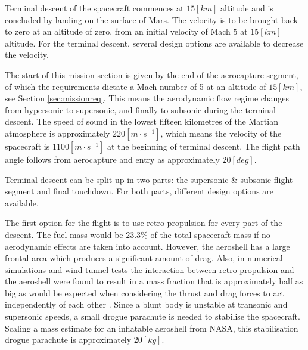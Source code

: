 Terminal descent of the spacecraft commences at $15 [km]$ altitude and is concluded by landing on the surface of Mars. The velocity is to be brought back to zero at an altitude of zero, from an initial velocity of Mach $5$ at $15 [km]$ altitude. For the terminal descent, several design options are available to decrease the velocity.%

The start of this mission section is given by the end of the aerocapture segment, of which the requirements dictate a Mach number of 5 at an altitude of $15 [km]$, see Section \ref{sec:missionreq}. This means the aerodynamic flow regime changes from hypersonic to supersonic, and finally to subsonic during the terminal descent. The speed of sound in the lowest fifteen kilometres of the Martian atmosphere is approximately $220 [m\cdot s^{-1}]$, which means the velocity of the spacecraft is $1100 [m\cdot s^{-1}]$ at the beginning of terminal descent. The flight path angle follows from aerocapture and entry as approximately $20 [deg]$.%

Terminal descent can be split up in two parts: the supersonic \& subsonic flight segment and final touchdown. For both parts, different design options are available.

The first option for the flight is to use retro-propulsion for every part of the descent. The fuel mass would be $23.3\%$ of the total spacecraft mass if no aerodynamic effects are taken into account. However, the aeroshell has a large frontal area which produces a significant amount of drag. Also, in numerical simulations and wind tunnel tests the interaction between retro-propulsion and the aeroshell were found to result in a mass fraction that is approximately half as big as would be expected when considering the thrust and drag forces to act independently of each other \cite{Korzun2009}. Since a blunt body is unstable at transonic and supersonic speeds, a small drogue parachute is needed to stabilise the spacecraft. Scaling a mass estimate for an inflatable aeroshell from NASA, this stabilisation drogue parachute is approximately $20 [kg]$.

